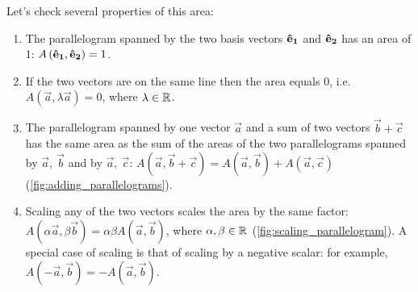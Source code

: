 \documentclass{article}
\begin{document}
Let's check several properties of this area:
\begin{enumerate}
	\item The parallelogram spanned by the two basis vectors $\mathbf{\hat{e}_{1}}$ and $\mathbf{\hat{e}_{2}}$ has an area of $1$: $A\left(\mathbf{\hat{e}_{1}},\mathbf{\hat{e}_{2}}\right)=1$.
	\item If the two vectors are on the same line then the area equals $0$, i.e. $A\left(\vec{a}, \lambda\vec{a}\right)=0$, where $\lambda\in\mathbb{R}^{}$.
	\item The parallelogram spanned by one vector $\vec{a}$ and a sum of two vectors $\vec{b}+\vec{c}$ has the same area as the sum of the areas of the two parallelograms spanned by $\vec{a},\ \vec{b}$ and by $\vec{a},\ \vec{c}$: $A\left(\vec{a},\vec{b}+\vec{c}\right)=A\left(\vec{a},\vec{b}\right)+A\left(\vec{a},\vec{c}\right)$ (\autoref{fig:adding_parallelograms}).
	\item Scaling any of the two vectors scales the area by the same factor: $A\left(\alpha\vec{a},\beta\vec{b}\right)=\alpha\beta A\left(\vec{a},\vec{b}\right)$, where $\alpha,\beta\in\mathbb{R}^{}$ (\autoref{fig:scaling_parallelogram}). A special case of scaling is that of scaling by a negative scalar: for example, $A\left(-\vec{a},\vec{b}\right)=-A\left(\vec{a},\vec{b}\right)$.
\end{enumerate}
\end{document}
